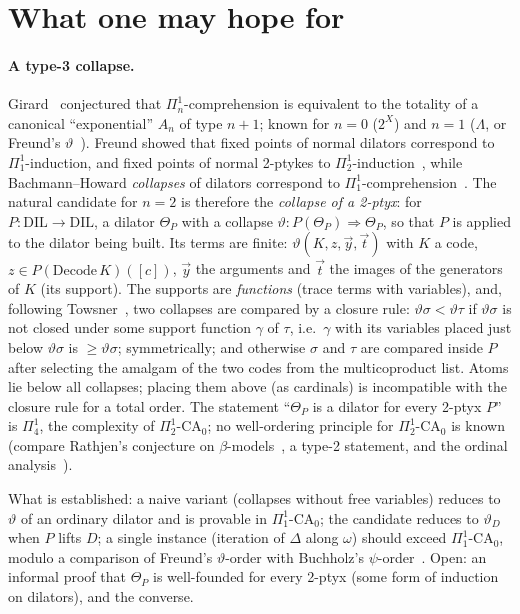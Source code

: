 \documentclass[11pt]{article}
\theoremstyle{definition}
\theoremstyle{remark}
\begin{document}
\section{What one may hope for}

\paragraph{A type-3 collapse.} Girard~\cite{GirH} conjectured that
$\Pi^1_n$-comprehension is equivalent to the totality of a canonical
``exponential'' $A_n$ of type $n+1$; known for $n=0$ ($2^X$) and $n=1$
($\Lambda$, or Freund's $\vartheta$~\cite{Fre19,AFW}). Freund showed that
fixed points of normal dilators correspond to $\Pi^1_1$-induction, and fixed
points of normal 2-ptykes to $\Pi^1_2$-induction~\cite{FrePilot}, while
Bachmann--Howard \emph{collapses} of dilators correspond to
$\Pi^1_1$-comprehension~\cite{Fre19}. The
natural candidate for $n=2$ is therefore the \emph{collapse of a 2-ptyx}:
for $P:\mathrm{DIL}\to\mathrm{DIL}$, a dilator $\Theta_P$ with a collapse
$\vartheta:P(\Theta_P)\Rightarrow\Theta_P$, so that $P$ is applied to the
dilator being built. Its terms are finite: $\vartheta(K,z,\vec y,\vec t)$
with $K$ a code, $z\in P(\mathrm{Decode}\,K)([c])$, $\vec y$ the arguments
and $\vec t$ the images of the generators of $K$ (its support). The
supports are \emph{functions} (trace terms with variables), and, following
Towsner~\cite{TowPoly}, two collapses are compared by a closure rule:
$\vartheta\sigma<\vartheta\tau$ if $\vartheta\sigma$ is not closed under
some support function $\gamma$ of $\tau$, i.e.\ $\gamma$ with its variables
placed just below $\vartheta\sigma$ is $\ge\vartheta\sigma$; symmetrically;
and otherwise $\sigma$ and $\tau$ are compared inside $P$ after selecting
the amalgam of the two codes from the multicoproduct list. Atoms lie below
all collapses; placing them above (as cardinals) is incompatible with the
closure rule for a total order. The
statement ``$\Theta_P$ is a dilator for every 2-ptyx $P$'' is $\Pi^1_4$,
the complexity of $\Pi^1_2$-$\mathrm{CA}_0$; no well-ordering principle for
$\Pi^1_2$-$\mathrm{CA}_0$ is known (compare Rathjen's conjecture on
$\beta$-models~\cite[Conj.~6.6]{Rat21}, a type-2 statement, and the ordinal
analysis~\cite{Rat05}).

What is established: a naive variant (collapses without free variables)
reduces to $\vartheta$ of an ordinary dilator and is provable in
$\Pi^1_1$-$\mathrm{CA}_0$; the candidate reduces to $\vartheta_D$ when $P$
lifts $D$; a single instance (iteration of $\Delta$ along $\omega$) should
exceed $\Pi^1_1$-$\mathrm{CA}_0$, modulo a comparison of Freund's
$\vartheta$-order with Buchholz's $\psi$-order~\cite{Buc86}.  Open: an informal proof
that $\Theta_P$ is well-founded for every 2-ptyx (some form of induction on
dilators), and the converse.
\end{document}
